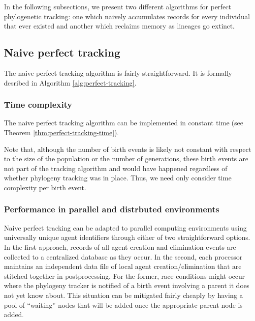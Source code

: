 In the following subsections, we present two different algorithms for perfect phylogenetic tracking: one which naively accumulates records for every individual that ever existed and another which reclaims memory as lineages go extinct.

\subsection{Naive perfect tracking}
\label{sec:naive-perfect-tracking}

The naive perfect tracking algorithm is fairly straightforward.
It is formally desribed in Algorithm \ref{alg:perfect-tracking}.



\subsubsection{Time complexity}

The naive perfect tracking algorithm can be implemented in constant time (see Theorem \ref{thm:perfect-tracking-time}).



Note that, although the number of birth events is likely not constant with respect to the size of the population or the number of generations,
these birth events are not part of the tracking algorithm and would have happened regardless of whether phylogeny tracking was in place.
Thus, we need only consider time complexity per birth event.

\subsubsection{Performance in parallel and distrbuted environments}
\label{sec:perfect-tracking-distrbuted}

Naive perfect tracking can be adapted to parallel computing environments using universally unique agent identifiers through either of two straightforward options.
In the first approach, records of all agent creation and elimination events are collected to a centralized database as they occur.
In the second, each processor maintains an independent data file of local agent creation/elimination that are stitched together in postprocessing.
For the former, race conditions might occur where the phylogeny tracker is notified of a birth event involving a parent it does not yet know about.
This situation can be mitigated fairly cheaply by having a pool of ``waiting'' nodes that will be added once the appropriate parent node is added.

